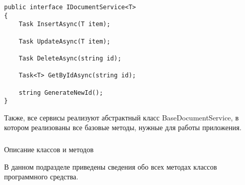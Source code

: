 \lstset{style=sharpc}
\begin{lstlisting}
public interface IDocumentService<T>
{
	Task InsertAsync(T item);

	Task UpdateAsync(T item);

	Task DeleteAsync(string id);

	Task<T> GetByIdAsync(string id);

	string GenerateNewId();
}
\end{lstlisting}

Также, все сервисы реализуют абстрактный класс BaseDocumentService, в котором реализованы все базовые методы, нужные для работы приложения.

\subsubsection{} Описание классов и методов
\label{sec:design:server:methods}

В данном подразделе приведены сведения обо всех методах классов программного средства.

	



